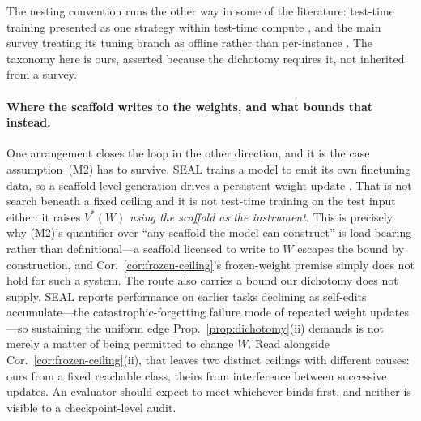 The nesting convention runs the other way in some of the literature: test-time training presented as one strategy within test-time compute \citep{munoz2025rttc}, and the main survey treating its tuning branch as offline rather than per-instance \citep{zhang2025testtime}. The taxonomy here is ours, asserted because the dichotomy requires it, not inherited from a survey.

\paragraph{Where the scaffold writes to the weights, and what bounds that instead.} One arrangement closes the loop in the other direction, and it is the case assumption~(M2) has to survive. SEAL trains a model to emit its own finetuning data, so a scaffold-level generation drives a persistent weight update \citep{zweiger2025seal}. That is not search beneath a fixed ceiling and it is not test-time training on the test input either: it raises $V^*(W)$ \emph{using the scaffold as the instrument}. This is precisely why (M2)'s quantifier over ``any scaffold the model can construct'' is load-bearing rather than definitional---a scaffold licensed to write to $W$ escapes the bound by construction, and Cor.~\ref{cor:frozen-ceiling}'s frozen-weight premise simply does not hold for such a system. The route also carries a bound our dichotomy does not supply. SEAL reports performance on earlier tasks declining as self-edits accumulate---the catastrophic-forgetting failure mode of repeated weight updates---so sustaining the uniform edge Prop.~\ref{prop:dichotomy}(ii) demands is not merely a matter of being permitted to change $W$. Read alongside Cor.~\ref{cor:frozen-ceiling}(ii), that leaves two distinct ceilings with different causes: ours from a fixed reachable class, theirs from interference between successive updates. An evaluator should expect to meet whichever binds first, and neither is visible to a checkpoint-level audit.

